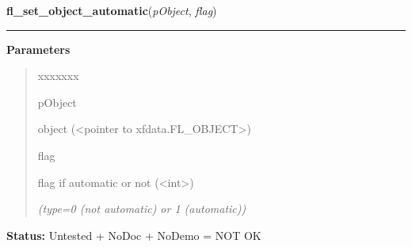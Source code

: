 \hspace{.8\funcindent}\begin{boxedminipage}{\funcwidth}

    \raggedright \textbf{fl\_set\_object\_automatic}(\textit{pObject}, \textit{flag})

    \vspace{-1.5ex}

    \rule{\textwidth}{0.5\fboxrule}
\setlength{\parskip}{2ex}
\setlength{\parskip}{1ex}
      \textbf{Parameters}
      \vspace{-1ex}

      \begin{quote}
        \begin{Ventry}{xxxxxxx}

          \item[pObject]

          object ({\textless}pointer to xfdata.FL\_OBJECT{\textgreater})

          \item[flag]

          flag if automatic or not ({\textless}int{\textgreater})

            {\it (type=0 (not automatic) or 1 (automatic))}

        \end{Ventry}

      \end{quote}

\textbf{Status:} Untested + NoDoc + NoDemo = NOT OK



    \end{boxedminipage}

    \label{xformslib:library:fl_object_is_automatic}

    \vspace{0.5ex}

